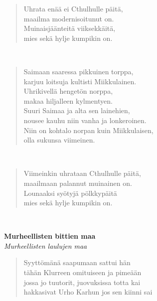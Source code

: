 \noindent\begin{minipage}{\linewidth}
\begin{verse}
	Uhrata enää ei Cthulhulle päitä,\\
	maailma modernisoitunut on.\\
	Muinaisjäänteitä viiksekkäitä,\\
	mies sekä hylje kumpikin on.\\
\end{verse}
\end{minipage}\\[10pt]
\noindent\begin{minipage}{\linewidth}
\begin{verse}
	Saimaan saaressa pikkuinen torppa,\\
	karjuu loitsuja kultisti Miikkulainen.\\
	Uhrikivellä hengetön norppa,\\
	makaa hiljalleen kylmentyen.\\
	Suuri Saimaa ja alta sen lainehien,\\
	nousee kauhu niin vanha ja lonkeroinen.\\
	Niin on kohtalo norpan kuin Miikkulaisen,\\
	olla sukunsa viimeinen.\\
\end{verse}
\end{minipage}\\[10pt]
\noindent\begin{minipage}{\linewidth}
\begin{verse}
	Viimeinkin uhrataan Cthulhulle päitä,\\
	maailmaan palannut muinainen on.\\
	Lounaaksi syötyjä pölkkypäitä\\
	mies sekä hylje kumpikin on.\\
\end{verse}
\end{minipage}\\[10pt]
%
%
\noindent\begin{minipage}{\linewidth}
\vspace{5pt}
\parbox[t]{0.85\linewidth}{\raggedright {\large\bf Murheellisten bittien maa}\\[2pt]\small\emph{Murheellisten laulujen maa}\\[6pt]}
\begin{verse}
	
	Syyttömänä saapumaan sattui hän\\
	tähän Klurreen omituiseen ja pimeään\\
	jossa jo tuutorit, juovuksissa totta kai\\
	hakkasivat Urho Karhun jos sen kiinni sai\\
\end{verse}
\end{minipage}\\[10pt]
